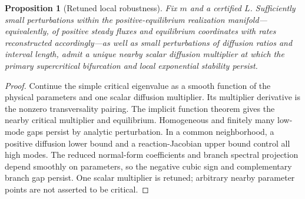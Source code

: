 \documentclass[11pt]{article}
\newtheorem{proposition}[theorem]{Proposition}
\theoremstyle{definition}
\newcommand{\1}{\mathbf 1}
\begin{document}
\begin{table}[t]
\centering
\small

\caption{Current-profile diagnostics generated from one exact source.
$\chi_D^{\rm unit}$ is the current unit-equilibrium stable-profile contrast;
$\chi_D^{\rm scale}$ and $\chi_H^{\rm scale}$ are the physical contrasts at
the certified square-root-scaling endpoint; ``product'' is their exact product
$23(91(m-2)-1)/63$; ``lower'' is $\sqrt{8(m-2)}$; and $\eta_m$, $c_m$, and
$\sqrt{-\eta_m/c_m}$ use the current unit-profile normal-form convention.
The identity $\chi_D^{\rm unit}=\chi_D^{\rm scale}\chi_H^{\rm scale}$ is
exact, not a numerical coincidence.  The table is illustrative and proves no
all-dimensional claim.}
\label{tab:finite}
\end{table}

\begin{proposition}[Retuned local robustness]\label{prop:robust}
Fix $m$ and a certified $L$.  Sufficiently small perturbations within the
positive-equilibrium realization manifold---equivalently, of positive steady
fluxes and equilibrium coordinates with rates reconstructed accordingly---as
well as small perturbations of diffusion ratios and interval length, admit a
unique nearby scalar diffusion multiplier at which the primary supercritical
bifurcation and local exponential stability persist.
\end{proposition}

\begin{proof}
Continue the simple critical eigenvalue as a smooth function of the physical
parameters and one scalar diffusion multiplier.  Its multiplier derivative is
the nonzero transversality pairing.  The implicit function theorem gives the
nearby critical multiplier and equilibrium.  Homogeneous and finitely many
low-mode gaps persist by analytic perturbation.  In a common neighborhood,
a positive diffusion lower bound and a reaction-Jacobian upper bound control
all high modes.  The reduced normal-form coefficients and branch spectral
projection depend smoothly on parameters, so the negative cubic sign and
complementary branch gap persist.  One scalar multiplier is retuned; arbitrary
nearby parameter points are not asserted to be critical.
\end{proof}
\end{document}

